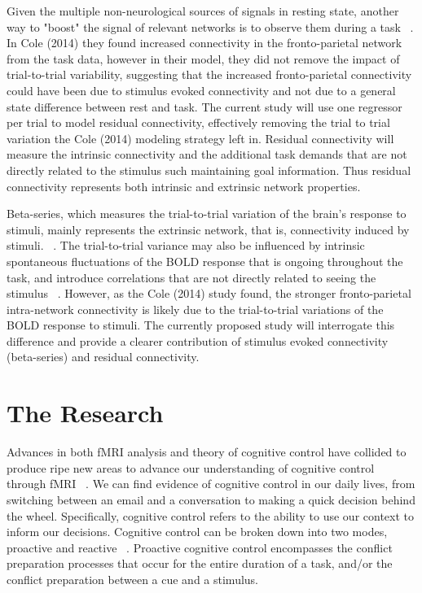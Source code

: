 \documentclass[phd,appendix,figures]{uithesis}
\begin{document}
Given the multiple non-neurological sources of signals in resting state, another way to "boost" the signal of relevant networks is to observe them during a task ~\citep{Cole2014}.
In Cole (2014) they found increased connectivity in the fronto-parietal network from the task data, however in their model, they did not remove the impact of trial-to-trial variability, suggesting that the increased fronto-parietal connectivity could have been due to stimulus evoked connectivity and not due to a general state difference between rest and task.
The current study will use one regressor per trial to model residual connectivity, effectively removing the trial to trial variation the Cole (2014) modeling strategy left in.
Residual connectivity will measure the intrinsic connectivity and the additional task demands that are not directly related to the stimulus such maintaining goal information.
Thus residual connectivity represents both intrinsic and extrinsic network properties.

Beta-series, which measures the trial-to-trial variation of the brain's response to stimuli, mainly represents the extrinsic network, that is, connectivity induced by stimuli. ~\citep{Rissman2004}.
The trial-to-trial variance may also be influenced by intrinsic spontaneous fluctuations of the BOLD response that is ongoing throughout the task, and introduce correlations that are not directly related to seeing the stimulus ~\citep{He2013}.
However, as the Cole (2014) study found, the stronger fronto-parietal intra-network connectivity is likely due to the trial-to-trial variations of the BOLD response to stimuli.
The currently proposed study will interrogate this difference and provide a clearer contribution of stimulus evoked connectivity (beta-series) and residual connectivity.


\chapter{The Research}

Advances in both fMRI analysis and theory of cognitive control have collided to produce ripe new areas to advance our understanding of cognitive control through fMRI ~\citep{Braver2012,Rissman2004,Mumford2012,Cisler2012}.
We can find evidence of cognitive control in our daily lives, from switching between an email and a conversation to making a quick decision behind the wheel. 
Specifically, cognitive control refers to the ability to use our context to inform our decisions. Cognitive control can be broken down into two modes, proactive and reactive ~\citep{Braver2012}. 
Proactive cognitive control encompasses the conflict preparation processes that occur for the entire duration of a task, and/or the conflict preparation between a cue and a stimulus.
\end{document}
